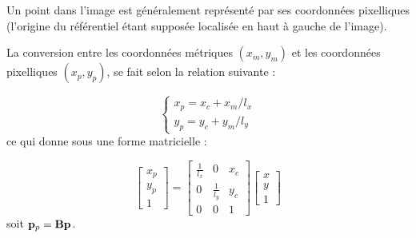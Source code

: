Un point dans l'image est généralement représenté par ses coordonnées 
pi\-xelliques (l'origine du référentiel étant supposée localisée en haut à 
gauche de l'image).

La conversion entre les coordonnées métriques $(x_m, y_m)$ et les coordonnées 
pixelliques $(x_p, y_p)$, se fait selon la relation suivante :

\begin{equation}
\left \lbrace
\begin{matrix}
x_p = x_c + x_m/l_x \\
y_p = y_c + y_m/l_y
\end{matrix} \right .
\label{intro:eq14}
\end{equation}
ce qui donne sous une forme matricielle :

\begin{equation}
\begin{bmatrix}
x_p \\y_p \\ 1
\end{bmatrix}
=
\begin{bmatrix}
\frac 1 {l_x} & 0 & x_c \\ 0 & \frac 1 {l_y} & y_c \\ 0 & 0 & 1 
\end{bmatrix}
\begin{bmatrix}
x \\ y \\ 1
\end{bmatrix}
\label{intro:eq15}
\end{equation}
soit ${\bf p}_p = {\bf B} {\bf p}$.

